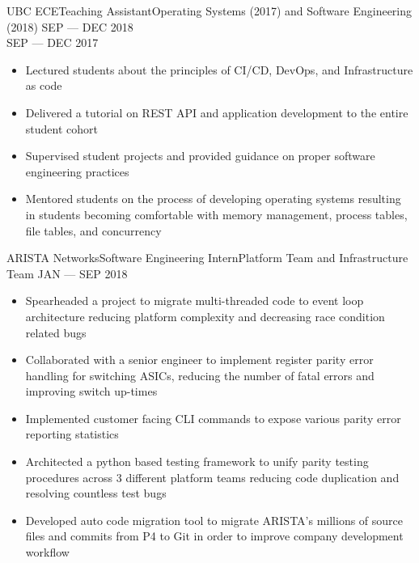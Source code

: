 
\begin{experiences}
    {UBC ECE}{Teaching Assistant}{Operating Systems (2017) and Software Engineering (2018)}
    {SEP --- DEC 2018 \\ SEP --- DEC 2017} {
      \begin{itemize}
        \item Lectured students about the principles of CI/CD, DevOps, and Infrastructure as code
        \item Delivered a tutorial on REST API and application development to the entire student
              cohort
        \item Supervised student projects and provided guidance on proper software engineering
              practices
        \item Mentored students on the process of developing operating systems resulting in students
              becoming comfortable with memory management, process tables, file tables,
            and concurrency
      \end{itemize}
    }

  \emptySeparator

    {ARISTA Networks}{Software Engineering Intern}{Platform Team and Infrastructure Team}
    {JAN --- SEP 2018}{
      \begin{itemize}
        \item Spearheaded a project to migrate multi-threaded code to event loop architecture
              reducing platform complexity and decreasing race condition related bugs
        \item Collaborated with a senior engineer to implement register parity error handling for
              switching ASICs, reducing the number of fatal errors and improving switch up-times
        \item Implemented customer facing CLI commands to expose various parity error reporting
              statistics
        \item Architected a python based testing framework to unify parity testing procedures
              across 3 different platform teams reducing code duplication and resolving countless
              test bugs
        \item Developed auto code migration tool to migrate ARISTA's millions of source files and
              commits from P4 to Git in order to improve company development workflow
      \end{itemize}
    }


\end{experiences}
